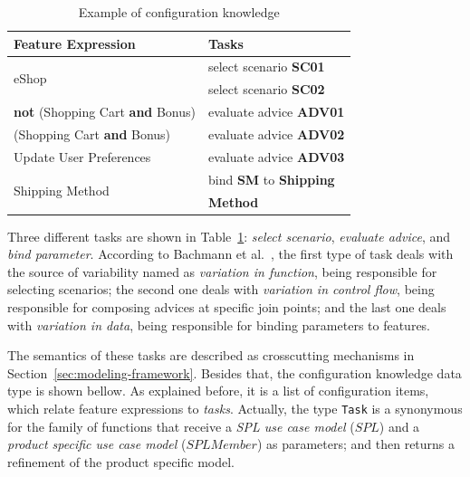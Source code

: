 \documentclass{sig-alt-full}
\begin{document}
\begin{table}[htb]
\begin{small}
\begin{tabular}{|lp{1.4in}|}
\hline
Feature Expression  						& Tasks					 \\ \hline \hline

\multirow{2}{*}{eShop}						& select scenario {\bf SC01} \\
											& select scenario {\bf SC02} \\	 \hline
{\bf not} (Shopping Cart {\bf and} Bonus) 	& evaluate advice {\bf ADV01} \\ \hline 
(Shopping Cart {\bf and} Bonus) 		& evaluate advice {\bf ADV02} 	\\   \hline
Update User Preferences 				& evaluate advice {\bf ADV03} \\     \hline 
\multirow{2}{*}{Shipping Method}		& bind {\bf SM} to {\bf Shipping} \\  
										& {\bf Method}\\ \hline
								
\end{tabular}
\end{small}
\caption{Example of configuration knowledge}
\label{tab:eshop-ck}
\end{table}

Three different tasks are shown
in Table~\ref{tab:eshop-ck}: \emph{select scenario}, \emph{evaluate advice}, and
\emph{bind parameter}. According to Bachmann et
al.~\cite{Bachmann:2001aa}, the first type of task deals with the source of
variability named as \emph{variation in function}, being responsible for
selecting scenarios; the second one deals with \emph{variation in control flow},
being responsible for composing advices at specific join points; and the last one
deals with \emph{variation in data}, being responsible for binding parameters to
features.

The semantics of these tasks are described as crosscutting mechanisms
in Section~\ref{sec:modeling-framework}. Besides that, the configuration knowledge data type is shown bellow. As explained before, it is a list of configuration items, which relate feature expressions to
\emph{tasks}. Actually, the type \texttt{Task} is a synonymous for the
family of functions that receive a \emph{SPL use case model} ($SPL$) and a \emph{product
specific use case model} ($SPLMember$) as parameters; and then returns a
refinement of the product specific model.
 
\end{document}
